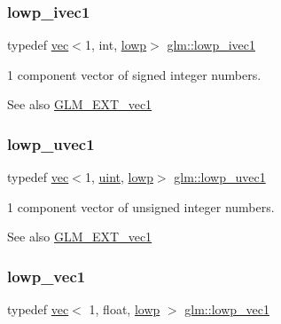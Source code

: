 \subsubsection{\texorpdfstring{lowp\+\_\+ivec1}{lowp\_ivec1}}
{\footnotesize\ttfamily typedef \mbox{\hyperlink{structglm_1_1vec}{vec}}$<$1, int, \mbox{\hyperlink{namespaceglm_a36ed105b07c7746804d7fdc7cc90ff25ae161af3fc695e696ce3bf69f7332bc2d}{lowp}}$>$ \mbox{\hyperlink{group__ext__vec1_ga46adb8a3dcf2312c343a093c3bf372d7}{glm\+::lowp\+\_\+ivec1}}}

1 component vector of signed integer numbers.

\begin{DoxySeeAlso}{See also}
\mbox{\hyperlink{group__ext__vec1}{G\+L\+M\+\_\+\+E\+X\+T\+\_\+vec1}} 
\end{DoxySeeAlso}
\mbox{\label{group__ext__vec1_gaa8d9fb78600ac97161b79c2e83f5a30f}} 
\subsubsection{\texorpdfstring{lowp\+\_\+uvec1}{lowp\_uvec1}}
{\footnotesize\ttfamily typedef \mbox{\hyperlink{structglm_1_1vec}{vec}}$<$1, \mbox{\hyperlink{group__core__precision_ga4fd29415871152bfb5abd588334147c8}{uint}}, \mbox{\hyperlink{namespaceglm_a36ed105b07c7746804d7fdc7cc90ff25ae161af3fc695e696ce3bf69f7332bc2d}{lowp}}$>$ \mbox{\hyperlink{group__ext__vec1_gaa8d9fb78600ac97161b79c2e83f5a30f}{glm\+::lowp\+\_\+uvec1}}}

1 component vector of unsigned integer numbers.

\begin{DoxySeeAlso}{See also}
\mbox{\hyperlink{group__ext__vec1}{G\+L\+M\+\_\+\+E\+X\+T\+\_\+vec1}} 
\end{DoxySeeAlso}
\mbox{\label{group__ext__vec1_gac40fba97d9ffbd2b3146d913d4ebc811}} 
\subsubsection{\texorpdfstring{lowp\+\_\+vec1}{lowp\_vec1}}
{\footnotesize\ttfamily typedef \mbox{\hyperlink{structglm_1_1vec}{vec}}$<$ 1, float, \mbox{\hyperlink{namespaceglm_a36ed105b07c7746804d7fdc7cc90ff25ae161af3fc695e696ce3bf69f7332bc2d}{lowp}} $>$ \mbox{\hyperlink{group__ext__vec1_gac40fba97d9ffbd2b3146d913d4ebc811}{glm\+::lowp\+\_\+vec1}}}


